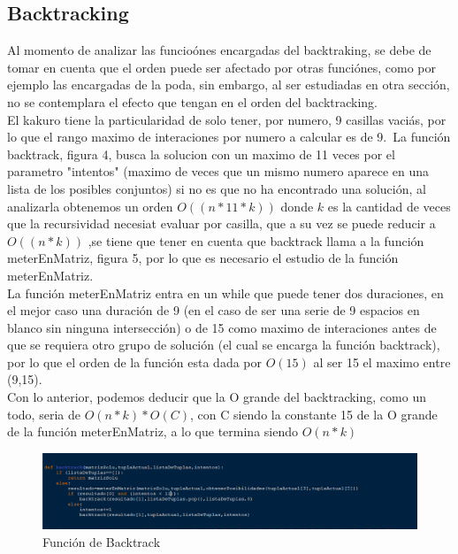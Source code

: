 \documentclass[journal]{IEEEtran}
\begin{document}
\subsection{Backtracking}
Al momento de analizar las funcio\'{o}nes encargadas del backtraking, se debe de tomar en cuenta que el orden puede ser afectado por otras funci\'{o}nes, como por ejemplo las encargadas de la poda, sin embargo, al ser estudiadas en otra secci\'{o}n, no se contemplara el efecto que tengan en el orden del backtracking.\\
El kakuro tiene la particularidad de solo tener, por numero, 9 casillas vaci\'{a}s, por lo que el rango maximo de interaciones por numero a calcular es de 9.\ La funci\'{o}n backtrack, figura 4, busca la solucion con un maximo de 11 veces por el parametro "intentos" (maximo de veces que un mismo numero aparece en una lista de los posibles conjuntos) si no es que no ha encontrado una soluci\'{o}n, al analizarla obtenemos un orden $O((n*{11}*k))$ donde $k$ es la cantidad de veces que la recursividad necesiat evaluar por casilla, que a su vez se puede reducir a  $O((n*k))$ ,se tiene que tener en cuenta que backtrack llama a la funci\'{o}n meterEnMatriz, figura 5, por lo que es necesario el estudio de la funci\'{o}n meterEnMatriz.
\\
La funci\'{o}n meterEnMatriz entra en un while que puede tener dos duraciones, en el mejor caso una duraci\'{o}n de 9 (en el caso de ser una serie de 9 espacios en blanco sin ninguna intersecci\'{o}n) o de 15 como maximo de interaciones antes de que se requiera otro grupo de soluci\'{o}n (el cual se encarga la funci\'{o}n backtrack), por lo que el orden de la funci\'{o}n esta dada por $O(15)$ al ser 15 el maximo entre (9,15).\\ Con lo anterior, podemos deducir que la O grande del backtracking, como un todo, seria de $O(n*k)*O(C)$, con C siendo la constante 15 de la O grande de la funci\'{o}n meterEnMatriz, a lo que termina siendo $O(n*k)$
\begin{figure}[H] 
	\centering \includegraphics[width=1\columnwidth]{backtrack_parte1.png}
	\caption{
		\label{fig:samplesetup}
		Función de Backtrack
	}
\end{figure}
\end{document}
